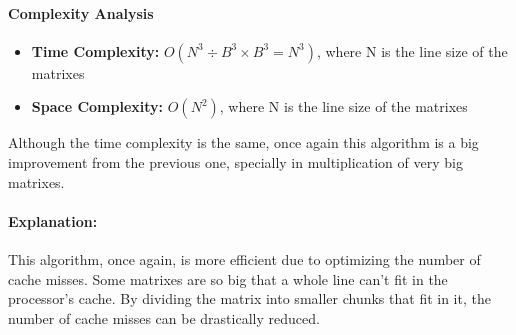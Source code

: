 \paragraph{Complexity Analysis}
\begin{itemize}
    \item \textbf{Time Complexity:} $O(N^3 \div B^3 \times B^3 = N^3)$, where N is the line size of the matrixes
    \item \textbf{Space Complexity:} $O(N^2)$, where N is the line size of the matrixes
\end{itemize}

Although the time complexity is the same, once again this algorithm is a big improvement from the previous one, specially in multiplication of very big matrixes.

\paragraph{Explanation:} This algorithm, once again, is more efficient due to optimizing the number of cache misses. Some matrixes are so big that a whole line can't fit in the processor's cache. By dividing the matrix into smaller chunks that fit in it, the number of cache misses can be drastically reduced.
